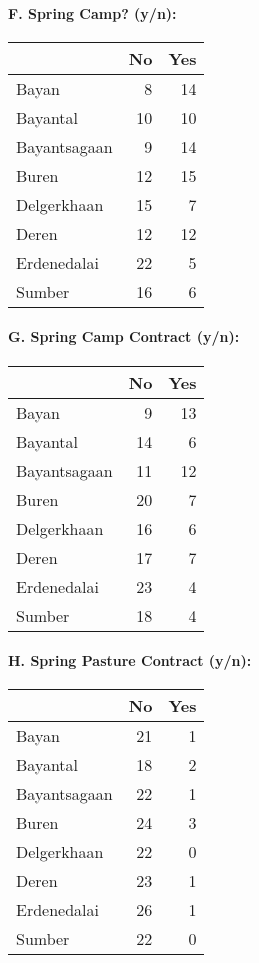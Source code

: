 \documentclass[
]{article}
\begin{document}
\paragraph{F. Spring Camp? (y/n):}\label{f.-spring-camp-yn}

\begin{longtable}[]{@{}lrr@{}}
\toprule\noalign{}
& No & Yes \\
\midrule\noalign{}
\endhead
\bottomrule\noalign{}
\endlastfoot
Bayan & 8 & 14 \\
Bayantal & 10 & 10 \\
Bayantsagaan & 9 & 14 \\
Buren & 12 & 15 \\
Delgerkhaan & 15 & 7 \\
Deren & 12 & 12 \\
Erdenedalai & 22 & 5 \\
Sumber & 16 & 6 \\
\end{longtable}

\paragraph{G. Spring Camp Contract
(y/n):}\label{g.-spring-camp-contract-yn}

\begin{longtable}[]{@{}lrr@{}}
\toprule\noalign{}
& No & Yes \\
\midrule\noalign{}
\endhead
\bottomrule\noalign{}
\endlastfoot
Bayan & 9 & 13 \\
Bayantal & 14 & 6 \\
Bayantsagaan & 11 & 12 \\
Buren & 20 & 7 \\
Delgerkhaan & 16 & 6 \\
Deren & 17 & 7 \\
Erdenedalai & 23 & 4 \\
Sumber & 18 & 4 \\
\end{longtable}

\paragraph{H. Spring Pasture Contract
(y/n):}\label{h.-spring-pasture-contract-yn}

\begin{longtable}[]{@{}lrr@{}}
\toprule\noalign{}
& No & Yes \\
\midrule\noalign{}
\endhead
\bottomrule\noalign{}
\endlastfoot
Bayan & 21 & 1 \\
Bayantal & 18 & 2 \\
Bayantsagaan & 22 & 1 \\
Buren & 24 & 3 \\
Delgerkhaan & 22 & 0 \\
Deren & 23 & 1 \\
Erdenedalai & 26 & 1 \\
Sumber & 22 & 0 \\
\end{longtable}
\end{document}
